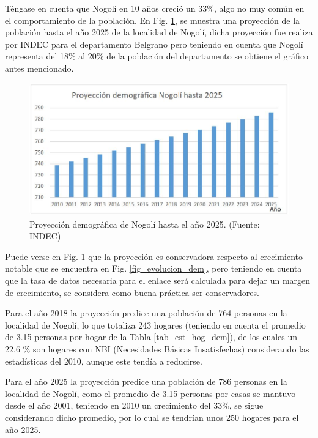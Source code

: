 \documentclass[12pt,a4paper]{book}
\begin{document}
\medskip 

Téngase en cuenta que Nogolí en 10 años creció un 33\%, algo no muy común en el comportamiento de la población. En Fig. \ref{fig_proy_25_dem}, se muestra una proyección de la población hasta el año 2025 de la localidad de Nogolí, dicha proyección fue realiza por INDEC para el departamento Belgrano pero teniendo en cuenta que Nogolí representa del 18\% al 20\% de la población del departamento se obtiene el gráfico antes mencionado.


\begin{figure} [H]
\centering
\includegraphics[width= 12cm]{../figuras/4_1_Fig4.jpg}
\caption{Proyección demográfica de Nogolí hasta el año 2025. (Fuente: INDEC)}
\label{fig_proy_25_dem}
\end{figure}

Puede verse en Fig. \ref{fig_proy_25_dem} que la proyección es conservadora respecto al crecimiento notable que se encuentra en Fig. \ref{fig_evolucion_dem}, pero teniendo en cuenta que la tasa de datos necesaria para el enlace será calculada para dejar un margen de crecimiento, se considera como buena práctica ser conservadores.

\medskip 

Para el año 2018 la proyección predice una población de 764 personas en la localidad de Nogolí, lo que totaliza 243 hogares (teniendo en cuenta el promedio de 3.15 personas por hogar de la Tabla \ref{tab_est_hog_dem}), de los cuales un 22.6 \% son hogares con NBI (Necesidades Básicas Insatisfechas) considerando las estadísticas del 2010, aunque este tendía a reducirse.

\medskip 

Para el año 2025 la proyección predice una población de 786 personas en la localidad de Nogolí, como el promedio de 3.15 personas por casas se mantuvo desde el año 2001, teniendo en 2010 un crecimiento del 33\%, se sigue considerando dicho promedio, por lo cual se tendrían unos 250 hogares para el año 2025.
\end{document}
